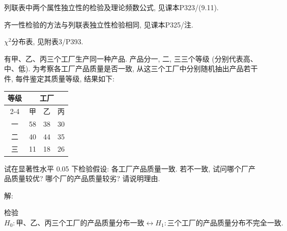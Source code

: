 \documentclass[standard]{ExBook}
\renewenvironment{shaded}{%
  \def\FrameCommand{\fboxsep=\FrameSep \colorbox{shadecolor}}%
  \MakeFramed{\advance\hsize-\width \FrameRestore}%
}{%
  \endMakeFramed
}
\begin{document}
\begin{qitems}
\textcolor{themeColor}{\selectfont {} 列联表中两个属性独立性的检验及理论频数公式, 见课本P323/(9.11).}

\textcolor{themeColor}{\selectfont {} 齐一性检验的方法与列联表独立性检验相同, 见课本P325/注.}

\textcolor{themeColor}{\selectfont {} $\chi^2$分布表, 见附表3/P393.}

\vspace{2.5cm-5em}

    \begin{bbox}
    \begin{shaded}
        \qitem
有甲、乙、丙三个工厂生产同一种产品. 产品分一, 二, 三三个等级 (分别代表高、中、低). 为考察各工厂产品质量是否一致, 从这三个工厂中分别随机抽出产品若干件, 每件鉴定其质量等级, 结果如下:
\begin{center}
\setlength{\tabcolsep}{51pt}
\begin{tabular}{c|c|c|c}
\hline
\multirow{2}{*}{等级} & \multicolumn{3}{c}{工厂} \\ 
\cline{2-4}
 & \multicolumn{1}{c|}{甲} & \multicolumn{1}{c|}{乙} & \multicolumn{1}{c}{丙} \\
\hline
一 & 58 & 38 & 30 \\
二 & 40 & 44 & 35 \\
三 & 11 & 18 & 26 \\
\hline
\end{tabular}
\end{center}
试在显著性水平 0.05 下检验假设: 各工厂产品质量一致. 若不一致, 试问哪个厂产品质量较优? 哪个厂的产品质量较劣? 请说明理由.
    \end{shaded}
    \end{bbox}

\vspace{\dimexpr2.5cm-5em\relax}

解: 

检验
$
H_0:\text{甲、乙、丙三个工厂的产品质量分布一致}
\leftrightarrow
H_1:\text{三个工厂的产品质量分布不完全一致}.
$


\end{qitems}
\end{document}
